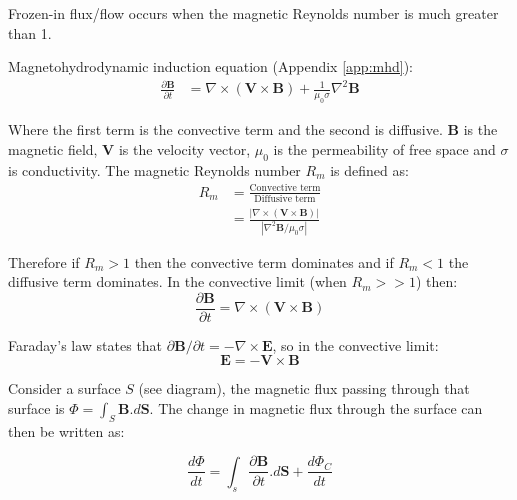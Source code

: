 \documentclass[12pt]{article}
\newcommand{\incfig}[2][1]{
    \def\svgwidth{#1\textwidth}
    
}
\begin{document}
Frozen-in flux/flow occurs when the magnetic Reynolds number is much greater than 1.


Magnetohydrodynamic induction equation (Appendix \ref{app:mhd}):
\begin{align}
    \frac{\partial \textbf{B}}{\partial t} &= \nabla \times (\textbf{V}\times\textbf{B})+\frac{1}{\mu_0\sigma}\nabla^2\textbf{B}
\end{align}

Where the first term is the convective term and the second is diffusive. $\textbf{B}$ is the magnetic field, \textbf{V} is the velocity vector, $\mu_0$ is the permeability of free space and $\sigma$ is conductivity. The magnetic Reynolds number $R_m$ is defined as:
\begin{align}
    R_m&=\frac{\text{Convective term}}{\text{Diffusive term}} \nonumber\\
    &=\frac{|\nabla\times(\textbf{V}\times\textbf{B})|}{|\nabla^2\textbf{B}/\mu_0\sigma|}
\end{align}

Therefore if $R_m>1$ then the convective term dominates and if $R_m<1$ the diffusive term dominates. In the convective limit (when $R_m>>1$) then:
\begin{equation}
    \frac{\partial\textbf{B}}{\partial t}=\nabla\times(\textbf{V}\times\textbf{B})
    \label{eq:convLim}
\end{equation}

Faraday's law states that $\partial\textbf{B}/\partial t=-\nabla\times\textbf{E}$, so in the convective limit:
\begin{equation}
    \textbf{E}=-\textbf{V}\times\textbf{B}
\end{equation}

\begin{figure}
    \hspace{1.5cm}
    \vspace{-5mm}
    \incfig[0.38]{frozen-in}
    \vspace{5mm}
\end{figure}

Consider a surface $S$ (see diagram), the magnetic flux passing through that surface is $\Phi=\int_S\textbf{B}.d\textbf{S}$. The change in magnetic flux through the surface can then be written as:

\begin{equation}
    \frac{d\Phi}{dt} = \int_s\frac{\partial\textbf{B}}{\partial t}.d\textbf{S} + \frac{d\Phi_C}{dt}
\end{equation}
\end{document}
